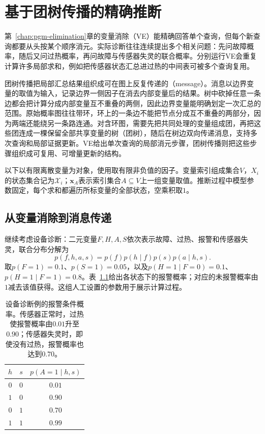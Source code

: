 \chapter{基于团树传播的精确推断}
\label{chap:pgm-junction-tree}

第~\ref{chap:pgm-elimination}章的变量消除（VE）能精确回答单个查询，但每个新查询都要从头按某个顺序消元。实际诊断往往连续提出多个相关问题：先问故障概率，随后又问过热概率，再问故障与传感器失灵的联合概率。分别运行VE会重复计算许多局部求和，例如把传感器状态汇总进过热的中间表可被多个查询复用。

团树传播把局部汇总结果组织成可在图上反复传递的（message）。消息以边界变量的取值为输入，记录边界一侧因子在消去内部变量后的结果。树中砍掉任意一条边都会把计算分成内部变量互不重叠的两侧，因此边界变量能明确划定一次汇总的范围。原始概率图往往带环，环上的一条边不能把节点分成互不重叠的两部分，因为两端还能绕另一条路连通。对含环图，需要先把共同处理的变量组成团，再把这些团连成一棵保留全部共享变量的树（团树），随后在树边双向传递消息，支持多次查询和局部证据更新。VE给出单次查询的局部消元步骤，团树传播则把这些步骤组织成可复用、可增量更新的结构。

以下以有限离散变量为对象，使用取有限非负值的因子。变量索引组成集合$V$，$X_i$的状态集合记为$\mathcal{X}_i$；$\bm{x}_A$表示索引集合$A\subseteq V$上一组变量取值。推断过程中模型参数固定，每个求和都遍历所标变量的全部状态，空乘积取$1$。

\section{从变量消除到消息传递}
\label{sec:pgm-junction-tree-from-elimination}

继续考虑设备诊断：二元变量$F,H,A,S$依次表示故障、过热、报警和传感器失灵，联合分布分解为
\begin{equation}
  p(f,h,a,s)=p(f)p(h\mid f)p(s)p(a\mid h,s).
  \label{eq:pgm-junction-tree-device}
\end{equation}
取$p(F=1)=0.1$、$p(S=1)=0.05$，以及$p(H=1\mid F=0)=0.1$、$p(H=1\mid F=1)=0.8$。表~\ref{tab:pgm-junction-tree-alarm-cpt}给出各状态下的报警概率；对应的未报警概率由$1$减去该值获得。这组人工设置的参数用于展示计算过程。

\begin{table}[htbp]
  \centering
  \begin{tabular}{ccc}
    \toprule
    $h$ & $s$ & $p(A=1\mid h,s)$\\
    \midrule
    $0$ & $0$ & $0.01$\\
    $1$ & $0$ & $0.90$\\
    $0$ & $1$ & $0.70$\\
    $1$ & $1$ & $0.99$\\
    \bottomrule
  \end{tabular}
  \caption{设备诊断例的报警条件概率。传感器正常时，过热使报警概率由$0.01$升至$0.90$；传感器失灵时，即使没有过热，报警概率也达到$0.70$。}
  \label{tab:pgm-junction-tree-alarm-cpt}
\end{table}

